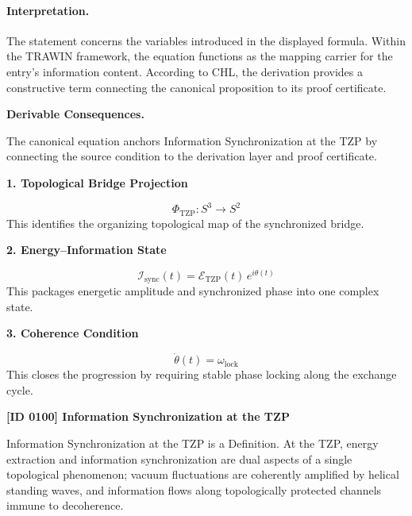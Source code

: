 \paragraph{Interpretation.}
The statement concerns the variables introduced in the displayed formula. Within the TRAWIN framework, the equation functions as the mapping carrier for the entry’s information content. According to CHL, the derivation provides a constructive term connecting the canonical proposition to its proof certificate.

\par\vspace{0.35em}
\noindent\textbf{Derivable Consequences.}\quad
\begingroup
\footnotesize
\raggedright
The canonical equation anchors Information Synchronization at the TZP by connecting the source condition to the derivation layer and proof certificate.
\par\endgroup

\noindent\textbf{1. Topological Bridge Projection}\par
\[
\Phi_{\mathrm{TZP}} : S^3 \longrightarrow S^2
\]
\noindent This identifies the organizing topological map of the synchronized bridge.\par
\noindent\textbf{2. Energy--Information State}\par
\[
\mathcal{I}_{\mathrm{sync}}(t)
=
\mathcal{E}_{\mathrm{TZP}}(t)\,e^{i\theta(t)}
\]
\noindent This packages energetic amplitude and synchronized phase into one complex state.\par
\noindent\textbf{3. Coherence Condition}\par
\[
\dot{\theta}(t)=\omega_{\mathrm{lock}}
\]
\noindent This closes the progression by requiring stable phase locking along the exchange cycle.\par

\clearpage
\noindent\textbf{[ID 0100] Information Synchronization at the TZP}\par
\vspace{0.35em}
\begingroup\small
{}
Information Synchronization at the TZP is a Definition. At the TZP, energy extraction and information synchronization are dual aspects of a single topological phenomenon; vacuum fluctuations are coherently amplified by helical standing waves, and information flows along topologically protected channels immune to decoherence.  

